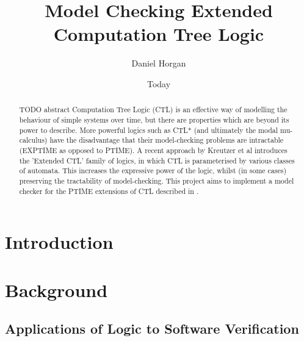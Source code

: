 \documentclass[11pt]{article}
\begin{document}
\title{Model Checking Extended Computation Tree Logic}
\author{Daniel Horgan}
\date{Today}
\maketitle

\begin{comment}
[scratch]
Blablabla said Nobody ~\cite{Nobody06}.
\end{comment}

\begin{abstract}

TODO abstract
Computation Tree Logic (CTL) is an effective way of modelling the behaviour of
simple systems over time, but there are properties which are beyond its power
to describe. More powerful logics such as CTL* (and ultimately the modal
mu-calculus) have the disadvantage that their model-checking problems are
intractable (EXPTIME as opposed to PTIME). A recent approach by Kreutzer et al
\cite{Kreutzer10} introduces the 'Extended CTL' family of logics, in which CTL
is parameterised by various classes of automata. This increases the expressive
power of the logic, whilst (in some cases) preserving the tractability of
model-checking. This project aims to implement a model checker for the PTIME
extensions of CTL described in \cite{Kreutzer10}.

\end{abstract}

\newpage

\tableofcontents
\setcounter{tocdepth}{3}

\newpage


\section{Introduction}



\section{Background}

\subsection{Applications of Logic to Software Verification}
\end{document}
